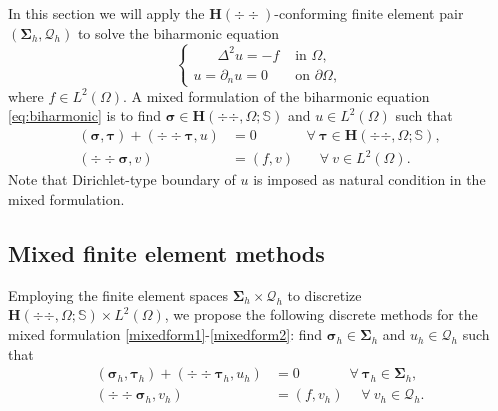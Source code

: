 In this section we will apply the $\boldsymbol H(\div\div)$-conforming finite element pair $(\boldsymbol\Sigma_h, \mathcal Q_h)$ to solve the biharmonic equation
\begin{equation}\label{eq:biharmonic}
\begin{cases}
\quad\;\;\,\Delta^2u = -f & \textrm{ in } \Omega,\\
u=\partial_nu=0 & \textrm{ on } \partial\Omega,
\end{cases}
\end{equation}
where $f\in L^2(\Omega)$. A mixed formulation of the biharmonic equation \eqref{eq:biharmonic} is to find $\boldsymbol \sigma\in\boldsymbol{H}(\div{\div },\Omega; \mathbb{S})$ and $u\in L^2(\Omega)$ such that
\begin{align}
(\boldsymbol{\sigma}, \boldsymbol{\tau})+(\div\div\boldsymbol{\tau}, u)&=0 \quad\quad\quad\;\; \forall~\boldsymbol{\tau}\in\boldsymbol{H}(\div{\div},\Omega; \mathbb{S}), \label{mixedform1} \\
(\div\div\boldsymbol{\sigma}, v)&=(f, v) \quad\;\;\; \forall~v\in L^2(\Omega). \label{mixedform2}
\end{align}
Note that Dirichlet-type boundary of $u$ is imposed as natural condition in the mixed formulation.

\subsection{Mixed finite element methods}
Employing the finite element spaces $\boldsymbol\Sigma_h\times\mathcal Q_h$ to discretize $\boldsymbol{H}(\div{\div },\Omega; \mathbb{S})\times L^2(\Omega)$, we propose the following discrete methods for the mixed formulation \eqref{mixedform1}-\eqref{mixedform2}:
find $\boldsymbol \sigma_h\in\boldsymbol\Sigma_h$ and $u_h\in \mathcal Q_h$ such that
\begin{align}
(\boldsymbol{\sigma}_h, \boldsymbol{\tau}_h)+(\div\div\boldsymbol{\tau}_h, u_h)&=0 \quad\quad\quad\;\; \forall~\boldsymbol{\tau}_h\in \boldsymbol\Sigma_h, \label{mfem1} \\
(\div\div\boldsymbol{\sigma}_h, v_h)&=(f, v_h) \quad\; \forall~v_h\in \mathcal Q_h. \label{mfem2}
\end{align}

